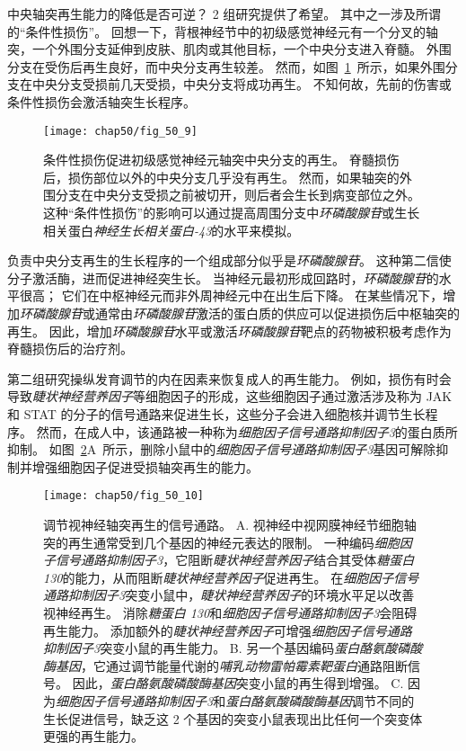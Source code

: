 中央轴突再生能力的降低是否可逆？
2 组研究提供了希望。
其中之一涉及所谓的“条件性损伤”。
回想一下，背根神经节中的初级感觉神经元有一个分叉的轴突，一个外围分支延伸到皮肤、肌肉或其他目标，一个中央分支进入脊髓。
外围分支在受伤后再生良好，而中央分支再生较差。
然而，如图~\ref{fig:50_9}~所示，如果外围分支在中央分支受损前几天受损，中央分支将成功再生。
不知何故，先前的伤害或条件性损伤会激活轴突生长程序。


\begin{figure}[htbp]
	\centering
	\texttt{[image: chap50/fig\_50\_9]}
	\caption{条件性损伤促进初级感觉神经元轴突中央分支的再生。
		脊髓损伤后，损伤部位以外的中央分支几乎没有再生。
		然而，如果轴突的外围分支在中央分支受损之前被切开，则后者会生长到病变部位之外。
		这种“条件性损伤”的影响可以通过提高周围分支中\textit{环磷酸腺苷}或生长相关蛋白\textit{神经生长相关蛋白-43}的水平来模拟。}
	\label{fig:50_9}
\end{figure}


负责中央分支再生的生长程序的一个组成部分似乎是\textit{环磷酸腺苷}。
这种第二信使分子激活酶，进而促进神经突生长。
当神经元最初形成回路时，\textit{环磷酸腺苷}的水平很高；
它们在中枢神经元而非外周神经元中在出生后下降。
在某些情况下，增加\textit{环磷酸腺苷}或通常由\textit{环磷酸腺苷}激活的蛋白质的供应可以促进损伤后中枢轴突的再生。
因此，增加\textit{环磷酸腺苷}水平或激活\textit{环磷酸腺苷}靶点的药物被积极考虑作为脊髓损伤后的治疗剂。


第二组研究操纵发育调节的内在因素来恢复成人的再生能力。
例如，损伤有时会导致\textit{睫状神经营养因子}等细胞因子的形成，这些细胞因子通过激活涉及称为 JAK 和 STAT 的分子的信号通路来促进生长，这些分子会进入细胞核并调节生长程序。
然而，在成人中，该通路被一种称为\textit{细胞因子信号通路抑制因子3}的蛋白质所抑制。
如图~\ref{fig:50_10}A~所示，删除小鼠中的\textit{细胞因子信号通路抑制因子3}基因可解除抑制并增强细胞因子促进受损轴突再生的能力。


\begin{figure}[htbp]
	\centering
	\texttt{[image: chap50/fig\_50\_10]}
	\caption{调节视神经轴突再生的信号通路。
		A. 视神经中视网膜神经节细胞轴突的再生通常受到几个基因的神经元表达的限制。
		一种编码\textit{细胞因子信号通路抑制因子3}，它阻断\textit{睫状神经营养因子}结合其受体\textit{糖蛋白 130}的能力，从而阻断\textit{睫状神经营养因子}促进再生。
		在\textit{细胞因子信号通路抑制因子3}突变小鼠中，\textit{睫状神经营养因子}的环境水平足以改善视神经再生。
		消除\textit{糖蛋白 130}和\textit{细胞因子信号通路抑制因子3}会阻碍再生能力。
		添加额外的\textit{睫状神经营养因子}可增强\textit{细胞因子信号通路抑制因子3}突变小鼠的再生能力。
		B. 另一个基因编码\textit{蛋白酪氨酸磷酸酶基因}，它通过调节能量代谢的\textit{哺乳动物雷帕霉素靶蛋白}通路阻断信号。
		因此，\textit{蛋白酪氨酸磷酸酶基因}突变小鼠的再生得到增强。
		C. 因为\textit{细胞因子信号通路抑制因子3}和\textit{蛋白酪氨酸磷酸酶基因}调节不同的生长促进信号，缺乏这 2 个基因的突变小鼠表现出比任何一个突变体更强的再生能力\cite{smith2009socs3}。}
	\label{fig:50_10}
\end{figure}


